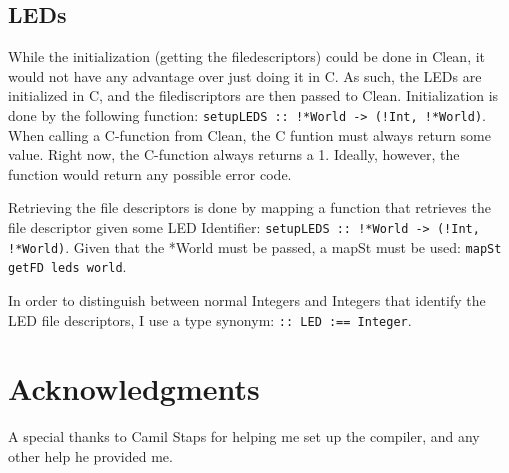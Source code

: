 \documentclass{scrartcl}
\begin{document}
\subsection{LEDs}
While the initialization (getting the filedescriptors) could be done in Clean, it would not have any advantage over just doing it in C.
As such, the LEDs are initialized in C, and the filediscriptors are then passed to Clean.
Initialization is done by the following function: \texttt{setupLEDS :: !*World -> (!Int, !*World)}.
When calling a C-function from Clean, the C funtion must always return some value.
Right now, the C-function always returns a 1. Ideally, however, the function would return any possible error code.

Retrieving the file descriptors is done by mapping a function that retrieves the file descriptor given some LED Identifier: \texttt{setupLEDS :: !*World -> (!Int, !*World)}.
Given that the *World must be passed, a mapSt must be used: \texttt{mapSt getFD leds world}.

In order to distinguish between normal Integers and Integers that identify the LED file descriptors, I use a type synonym: \texttt{:: LED :== Integer}.

\section{Acknowledgments}
A special thanks to Camil Staps for helping me set up the compiler, and any other help he provided me.
\end{document}
